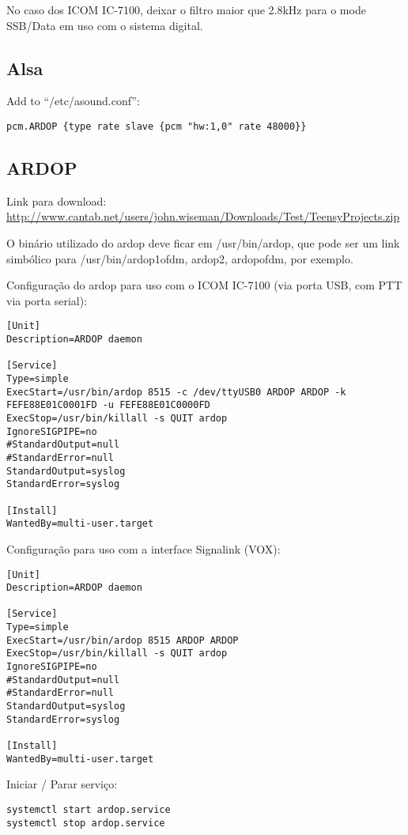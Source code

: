 \documentclass[11pt,a4paper]{article}
\begin{document}
No caso dos ICOM IC-7100, deixar o filtro maior que 2.8kHz para o mode
SSB/Data em uso com o sistema digital.

\subsection{Alsa}

Add to ``/etc/asound.conf'':
\begin{verbatim}
pcm.ARDOP {type rate slave {pcm "hw:1,0" rate 48000}}
\end{verbatim}

\subsection{ARDOP}

Link para download: \url{http://www.cantab.net/users/john.wiseman/Downloads/Test/TeensyProjects.zip}

O binário utilizado do ardop deve ficar em /usr/bin/ardop, que pode ser um
link simbólico para /usr/bin/{ardop1ofdm, ardop2, ardopofdm}, por exemplo.

Configuração do ardop para uso com o ICOM IC-7100 (via porta USB, com PTT
via porta serial):
\begin{verbatim}
[Unit]
Description=ARDOP daemon

[Service]
Type=simple
ExecStart=/usr/bin/ardop 8515 -c /dev/ttyUSB0 ARDOP ARDOP -k FEFE88E01C0001FD -u FEFE88E01C0000FD
ExecStop=/usr/bin/killall -s QUIT ardop
IgnoreSIGPIPE=no
#StandardOutput=null
#StandardError=null
StandardOutput=syslog
StandardError=syslog

[Install]
WantedBy=multi-user.target
\end{verbatim}

Configuração para uso com a interface Signalink (VOX):
\begin{verbatim}
[Unit]
Description=ARDOP daemon

[Service]
Type=simple
ExecStart=/usr/bin/ardop 8515 ARDOP ARDOP
ExecStop=/usr/bin/killall -s QUIT ardop
IgnoreSIGPIPE=no
#StandardOutput=null
#StandardError=null
StandardOutput=syslog
StandardError=syslog

[Install]
WantedBy=multi-user.target
\end{verbatim}


Iniciar / Parar serviço:
\begin{verbatim}
systemctl start ardop.service
systemctl stop ardop.service
\end{verbatim}
\end{document}
